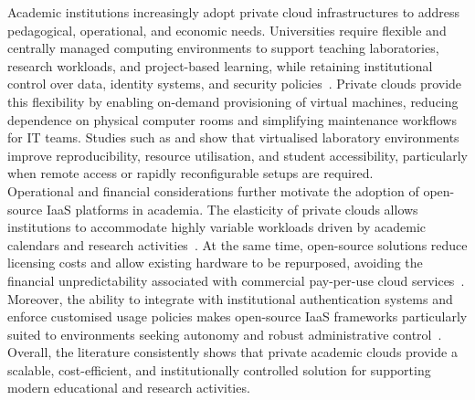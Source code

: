 \documentclass[sigplan]{acmart}
\begin{document}
        Academic institutions increasingly adopt private cloud infrastructures to address pedagogical, operational, and economic needs. Universities require flexible and centrally managed computing environments to support teaching laboratories, research workloads, and project-based learning, while retaining institutional control over data, identity systems, and security policies~\cite{lynnComparativeStudyCurrent2015, vijayakumarPrivateCloudInfrastructure2025}. Private clouds provide this flexibility by enabling on-demand provisioning of virtual machines, reducing dependence on physical computer rooms and simplifying maintenance workflows for IT teams. Studies such as \citeauthor{alvesUsingCloudBuild2014}\cite{alvesUsingCloudBuild2014} and \citeauthor{bonnerUsingOpenStackImprove2013}\cite{bonnerUsingOpenStackImprove2013} show that virtualised laboratory environments improve reproducibility, resource utilisation, and student accessibility, particularly when remote access or rapidly reconfigurable setups are required.\\
        
        Operational and financial considerations further motivate the adoption of open-source IaaS platforms in academia. The elasticity of private clouds allows institutions to accommodate highly variable workloads driven by academic calendars and research activities~\cite{sheelaDeployingOpenStackCloud2017}. At the same time, open-source solutions reduce licensing costs and allow existing hardware to be repurposed, avoiding the financial unpredictability associated with commercial pay-per-use cloud services~\cite{vijayakumarPrivateCloudInfrastructure2025, alvesUsingCloudBuild2014}. Moreover, the ability to integrate with institutional authentication systems and enforce customised usage policies makes open-source IaaS frameworks particularly suited to environments seeking autonomy and robust administrative control~\cite{oleksiukExperienceMaintenanceAcademic2021}.\\

        Overall, the literature consistently shows that private academic clouds provide a scalable, cost-efficient, and institutionally controlled solution for supporting modern educational and research activities.
        
\end{document}
